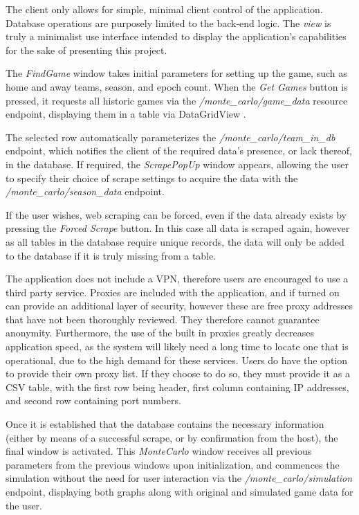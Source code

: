 \documentclass{thesis-ekf}
\theoremstyle{definition}
\theoremstyle{remark}
\begin{document}
The client only allows for simple, minimal client control of the application. Database operations are purposely limited to the back-end logic. The \emph{view} is truly a minimalist use interface intended to display the application's capabilities for the sake of presenting this project.

The \emph{FindGame} window takes initial parameters for setting up the game, such as home and away teams, season, and epoch count. When the \emph{Get Games} button is pressed, it requests all historic games via the \emph{/monte\_carlo/game\_data} resource endpoint, displaying them in a table via DataGridView \cite{dgv}.

The selected row automatically parameterizes the \emph{/monte\_carlo/team\_in\_db} endpoint, which notifies the client of the required data's presence, or lack thereof, in the database. If required, the \emph{ScrapePopUp} window appears, allowing the user to specify their choice of scrape settings to acquire the data with the \emph{/monte\_carlo/season\_data} endpoint. 

If the user wishes, web scraping can be forced, even if the data already exists by pressing the \emph{Forced Scrape} button. In this case all data is scraped again, however as all tables in the database require unique records, the data will only be added to the database if it is truly missing from a table.

The application does not include a VPN, therefore users are encouraged to use a third party service. Proxies are included with the application, and if turned on can provide an additional layer of security, however these are free proxy addresses that have not been thoroughly reviewed. They therefore cannot guarantee anonymity. Furthermore, the use of the built in proxies greatly decreases application speed, as the system will likely need a long time to locate one that is operational, due to the high demand for these services. Users do have the option to provide their own proxy list. If they choose to do so, they must provide it as a CSV table, with the first row being header, first column containing IP addresses, and second row containing port numbers.

Once it is established that the database contains the necessary information (either by means of a successful scrape, or by confirmation from the host), the final window is activated. This \emph{MonteCarlo} window receives all previous parameters from the previous windows upon initialization, and commences the simulation without the need for user interaction via the \emph{/monte\_carlo/simulation} endpoint, displaying both graphs along with original and simulated game data for the user.
\end{document}

